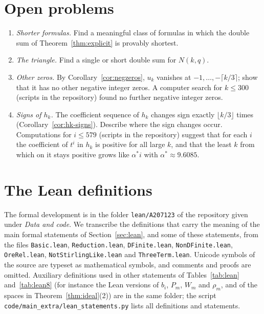 \documentclass[11pt]{amsart}
\theoremstyle{definition}
\newcommand{\lean}[1]{\texttt{#1}}
\begin{document}
\section{Open problems}\label{sec:open}

\begin{enumerate}
\item \emph{Shorter formulas.} Find a meaningful class of formulas in which the double sum of Theorem~\ref{thm:explicit} is provably shortest.
\item \emph{The triangle.} Find a single or short double sum for $N(k,q)$.
\item \emph{Other zeros.} By Corollary~\ref{cor:negzeros}, $u_k$ vanishes at $-1,\dots,-\lceil k/3\rceil$; show that it has no other negative integer zeros. A computer search for $k\le300$ (scripts in the repository) found no further negative integer zeros.
\item \emph{Signs of $h_k$.} The coefficient sequence of $h_k$ changes sign exactly $\lfloor k/3\rfloor$ times (Corollary~\ref{cor:hk-signs}). Describe where the sign changes occur. Computations for $i\le579$ (scripts in the repository) suggest that for each $i$ the coefficient of $t^i$ in $h_k$ is positive for all large $k$, and that the least $k$ from which on it stays positive grows like $\alpha^*i$ with $\alpha^*\approx9.6085$.
\end{enumerate}

\clearpage
\appendix
\section{The Lean definitions}\label{app:lean}

\begin{sloppypar}
The formal development is in the folder \lean{lean/A207123} of the repository given under \emph{Data and code}. We transcribe the definitions that carry the meaning of the main formal statements of Section~\ref{sec:lean}, and some of these statements, from the files \lean{Basic.lean}, \lean{Reduction.lean}, \lean{DFinite.lean}, \lean{NonDFinite.lean}, \lean{OreRel.lean}, \lean{NotStirlingLike.lean} and \lean{ThreeTerm.lean}. Unicode symbols of the source are typeset as mathematical symbols, and comments and proofs are omitted. Auxiliary definitions used in other statements of Tables~\ref{tab:lean} and~\ref{tab:lean8} (for instance the Lean versions of $b_i$, $P_m$, $W_m$ and $\rho_m$, and of the spaces in Theorem~\ref{thm:ideal}(2)) are in the same folder; the script \lean{code/main\_extra/lean\_statements.py} lists all definitions and statements.
\end{sloppypar}
\end{document}
